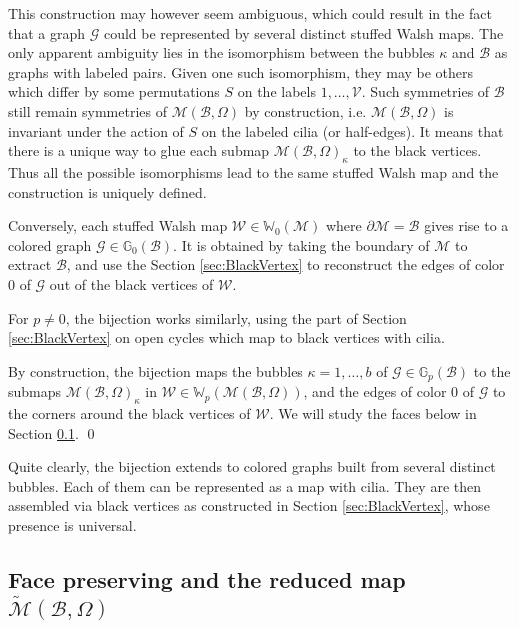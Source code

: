 \documentclass[aps,prd,10pt,notitlepage,nofootinbib,superscriptaddress,showkeys,showpacs]{revtex4-1}
\begin{document}
This construction may however seem ambiguous, which could result in the fact that a graph ${\mathcal{G}}$ could be represented by several distinct stuffed Walsh maps. The only apparent ambiguity lies in the isomorphism between the bubbles $\kappa$ and ${\mathcal{B}}$ as graphs with labeled pairs. Given one such isomorphism, they may be others which differ by some permutations $S$ on the labels $1, \dotsc, {\mathcal{V}}$. Such symmetries of ${\mathcal{B}}$ still remain symmetries of ${\mathcal{M}}({\mathcal{B}}, \Omega)$ by construction, i.e. ${\mathcal{M}}({\mathcal{B}}, \Omega)$ is invariant under the action of $S$ on the labeled cilia (or half-edges). It means that there is a unique way to glue each submap ${\mathcal{M}}({\mathcal{B}}, \Omega)_\kappa$ to the black vertices. Thus all the possible isomorphisms lead to the same stuffed Walsh map and the construction is uniquely defined.

Conversely, each stuffed Walsh map ${\mathcal{W}}\in{\mathbb{W}}_0({\mathcal{M}})$ where $\partial {\mathcal{M}} = {\mathcal{B}}$ gives rise to a colored graph ${\mathcal{G}}\in {\mathbb{G}}_0({\mathcal{B}})$. It is obtained by taking the boundary of ${\mathcal{M}}$ to extract ${\mathcal{B}}$, and use the Section \ref{sec:BlackVertex} to reconstruct the edges of color 0 of ${\mathcal{G}}$ out of the black vertices of ${\mathcal{W}}$.

For $p\neq 0$, the bijection works similarly, using the part of Section \ref{sec:BlackVertex} on open cycles which map to black vertices with cilia.

By construction, the bijection maps the bubbles $\kappa = 1, \dotsc, b$ of ${\mathcal{G}}\in {\mathbb{G}}_p({\mathcal{B}})$ to the submaps ${\mathcal{M}}({\mathcal{B}}, \Omega)_\kappa$ in ${\mathcal{W}}\in{\mathbb{W}}_p({\mathcal{M}}({\mathcal{B}}, \Omega))$, and the edges of color 0 of ${\mathcal{G}}$ to the corners around the black vertices of ${\mathcal{W}}$. We will study the faces below in Section \ref{sec:Faces}.
\qed

Quite clearly, the bijection extends to colored graphs built from several distinct bubbles. Each of them can be represented as a map with cilia. They are then assembled via black vertices as constructed in Section \ref{sec:BlackVertex}, whose presence is universal.

\subsection{Face preserving and the reduced map $\tilde{\mathcal{M}}({\mathcal{B}}, \Omega)$} \label{sec:Faces}
\end{document}
